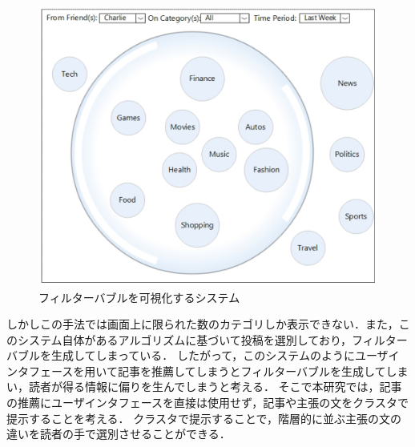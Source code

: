 \documentclass[12pt,a4j,dvipdfmx]{jreport}
\begin{document}
\begin{figure}[H]
	\centering
	\includegraphics[keepaspectratio, width=120mm]{img/bubble_ui.png}
	\caption{フィルターバブルを可視化するシステム\protect\footnotemark[13]}
	\label{fig_bubble_ui}
\end{figure}

しかしこの手法では画面上に限られた数のカテゴリしか表示できない．また，このシステム自体があるアルゴリズムに基づいて投稿を選別しており，フィルターバブルを生成してしまっている．
したがって，このシステムのようにユーザインタフェースを用いて記事を推薦してしまうとフィルターバブルを生成してしまい，読者が得る情報に偏りを生んでしまうと考える．
そこで本研究では，記事の推薦にユーザインタフェースを直接は使用せず，記事や主張の文をクラスタで提示することを考える．
クラスタで提示することで，階層的に並ぶ主張の文の違いを読者の手で選別させることができる．


\end{document}
